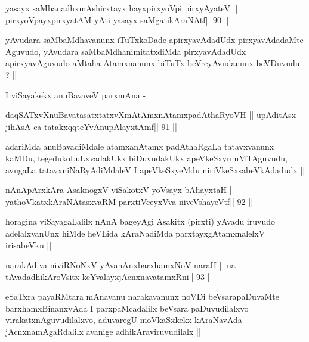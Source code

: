 \begin{shl}
yasayx saMbanadhxmAshirxtayx hayxpirxyoV\s pi pirxyAyateV ||
pirxyoV\s payxpirxyatAM yAti yasayx saMgatikAraNAtf\hfill || 90 ||
\end{shl}

\begin{artha}
yAvudara saMbaMdhavanunx iTuTxkoDade apirxyavAdadUdx pirxyavAdadaMte
Aguvudo, yAvudara saMbaMdhanimitatxdiMda pirxyavAdadUdx
apirxyavAguvudo aMtaha Atamxnanunx biTuTx beVreyAvudanunx beVDuvudu ? ||
\end{artha}

\begin{artha}
I viSayakekx anuBavaveV parxmAna -
\end{artha}

\begin{shl}
daqSATxvX\s nuBavatasatxtatxvXmAtAmxnAtamxpadAthaRyoVH ||
upAditAsx jihAsA ca tatakxqqteYvAnupAlayxtAmf\hfill || 91 ||
\end{shl}

\begin{artha}
adariMda anuBavadiMdale atamxanAtamx padAthaRgaLa tatavxvanunx kaMDu,
tegedukoLuLxvadakUkx biDuvudakUkx apeVkeSxyu uMTAguvudu, avugaLa
tatavxniNaRyAdiMdaleV I apeVkeSxyeMdu niriVkeSxsabeVkAdadudx ||
\end{artha}

\begin{shl}
nAnApArxkAra AsaknogxV viSakotxV yoV\s sayx bAhayxtaH ||
yathoVkatxkAraNAtasxvaRM parxtiVceyxVva niveVshayeVtf\hfill || 92 ||
\end{shl}

\begin{artha}
horagina viSayagaLalilx nAnA bageyAgi Asakitx (pirxti) yAvadu iruvudo
adelalxvanUnx hiMde heVLida kAraNadiMda parxtayxgAtamxnalelxV
irisabeVku ||
\end{artha}

\begin{shl}
narakAdiva niviRNoNxV yAvanAnx\s\s  barxhamxNoV naraH ||
na tAvadadhikAroV\s sitx keYvalayxjAcnxnavatamxRni\hfill || 93 ||
\end{shl}

\begin{artha}
eSaTxra payaRMtara mAnavanu narakavanunx noVDi beVsarapaDuvaMte
barxhamxBinanxvAda I parxpaMcadalilx beVsara paDuvudilalxvo
virakatxnAguvudilalxvo, aduvaregU moVkaSxkekx kAraNavAda
jAcnxnamAgaRdalilx avanige adhikAraviruvudilalx ||
\end{artha}

